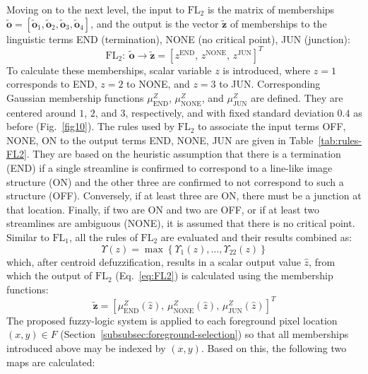 Moving on to the next level, the input to $\mathrm{FL}_{2}$ is the matrix of memberships $\tilde{\mathbf{o}}=\left[\tilde{\mathbf{o}}_{1},\tilde{\mathbf{o}}_{2},\tilde{\mathbf{o}}_{3},\tilde{\mathbf{o}}_{4}\right]$, and the output is the vector $\tilde{\mathbf{z}}$ of memberships to the linguistic terms END (termination), NONE (no critical point), JUN (junction):
\begin{equation}
\mathrm{FL}_{2}\!:\ \tilde{\mathbf{o}} \rightarrow \tilde{\mathbf{z}} = \left[z^{\textrm{END}}\!,\, z^{\textrm{NONE}}\!,\, z^{\textrm{JUN}}\right]^T
\label{eq:FL2}
\end{equation}
To calculate these memberships, scalar variable $z$ is introduced, where $z=1$ corresponds to END, $z=2$ to NONE, and $z=3$ to JUN. Corresponding Gaussian membership functions $\mu_{\textrm{END}}^{Z}$, $\mu_{\textrm{NONE}}^{Z}$, and $\mu_{\textrm{JUN}}^{Z}$ are defined. They are centered around $1$, $2$, and $3$, respectively, and with fixed standard deviation $0.4$ as before (Fig.~\ref{fig10}). The rules used by $\mathrm{FL}_{2}$ to associate the input terms OFF, NONE, ON to the output terms END, NONE, JUN are given in Table~\ref{tab:rules-FL2}. They are based on the heuristic assumption that there is a termination (END) if a single streamline is confirmed to correspond to a line-like image structure (ON) and the other three are confirmed to not correspond to such a structure (OFF). Conversely, if at least three are ON, there must be a junction at that location. Finally, if two are ON and two are OFF, or if at least two streamlines are ambiguous (NONE), it is assumed that there is no critical point. Similar to $\mathrm{FL}_{1}$, all the rules of $\mathrm{FL}_{2}$ are evaluated and their results combined as:
\begin{equation}
\Upsilon(z) = \max\left\{\Upsilon_{1}(z),\dots,\Upsilon_{22}(z)\right\}
\end{equation}
which, after centroid defuzzification, results in a scalar output value $\hat{z}$, from which the output of $\mathrm{FL}_{2}$ (Eq.~\ref{eq:FL2}) is calculated using the membership functions:
\begin{equation}
\tilde{\mathbf{z}} = \left[\mu_{\textrm{END}}^{Z}(\hat{z}),\, \mu_{\textrm{NONE}}^{Z}(\hat{z}),\, \mu_{\textrm{JUN}}^{Z}(\hat{z})\right]^{T}
\end{equation}
The proposed fuzzy-logic system is applied to each foreground pixel location $(x,y)\in F$ (Section~\ref{subsubsec:foreground-selection}) so that all memberships introduced above may be indexed by $(x,y)$. Based on this, the following two maps are calculated:
